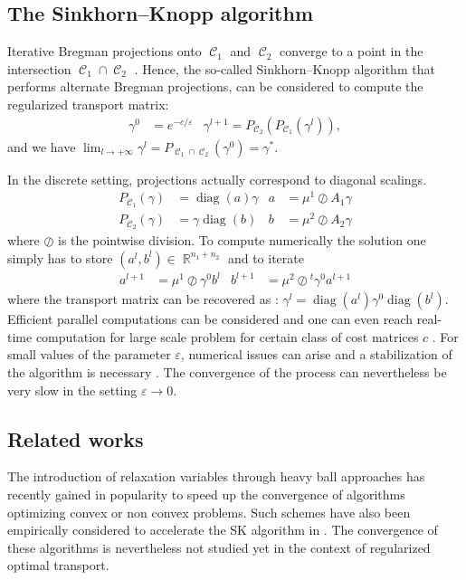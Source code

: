 \documentclass{article} %
\DeclareMathOperator{\IR}{\mathbb{R}}
\DeclareMathOperator{\Ccal}{\mathcal{C}}
\DeclareMathOperator{\diag}{diag}
\renewcommand{\epsilon}{\varepsilon}
\theoremstyle{plain}
\theoremstyle{definition}
\theoremstyle{remark}
\begin{document}
\subsection{The Sinkhorn--Knopp algorithm}
Iterative Bregman projections onto $\Ccal_1$ and $\Ccal_2$ converge to a point in the intersection $\Ccal_1 \cap \Ccal_2$ \cite{bregman67}. Hence, the so-called Sinkhorn--Knopp algorithm \cite{sinkhorn64} that performs alternate Bregman projections, can be considered to compute the regularized  transport matrix:
\begin{align*}
\gamma^0 &= e^{-c/\epsilon} &
\gamma^{l+1} = P_{\Ccal_2}(P_{\Ccal_1}(\gamma^l)),
\end{align*}
and we have 
$\lim_{l\rightarrow +\infty} \gamma^l = P_{\Ccal_1 \cap \Ccal_2}(\gamma^0) = \gamma^*.$

In the discrete setting,  projections actually correspond to diagonal scalings.
\begin{align}\label{scaling}
P_{\Ccal_1}(\gamma) &= \diag(a) \gamma &
a &=  {\mu^1}\oslash{A_1 \gamma} \\
P_{\Ccal_2}(\gamma) &= \gamma \diag(b) &
b &= {\mu^2}\oslash{A_2 \gamma}\nonumber
\end{align}
where $\oslash$ is the pointwise division. 
To compute numerically the solution  one simply has to store $(a^l, b^l)\in\IR^{n_1+n_2}$ and to iterate
\begin{align*}
a^{l+1} &= {\mu^1}\oslash{\gamma^0 b^l} &
b^{l+1} &= {\mu^2}\oslash{^t \gamma^0 a^{l+1}} 
\end{align*}
where the transport matrix can be recovered as :
$\gamma^l = \diag(a^l) \gamma^0 \diag(b^l).$ 
Efficient parallel computations can be considered \cite{cuturi13} and one can even reach real-time computation for large scale problem for certain class of cost matrices $c$ \cite{Solomon2015}. 
For small values of the parameter $\epsilon$, numerical issues can arise and a stabilization of the algorithm is necessary \cite{2016arXiv160705816C}.
The convergence of the process can nevertheless be very slow  in the setting $\epsilon\to 0$.
\subsection{Related works }
The introduction of relaxation variables through heavy ball approaches \cite{POLYAK19641} has recently gained in popularity  to speed up the convergence of algorithms optimizing convex \cite{2014arXiv1412.7457G} or non convex \cite{Zavriev1993,2016arXiv160609070O} problems. Such schemes have also been empirically considered to accelerate the SK algorithm  in \cite{peyre2016quantum,2017arXiv170801955S}. The convergence of these algorithms is nevertheless not studied yet in the context of regularized optimal transport.
\end{document}
